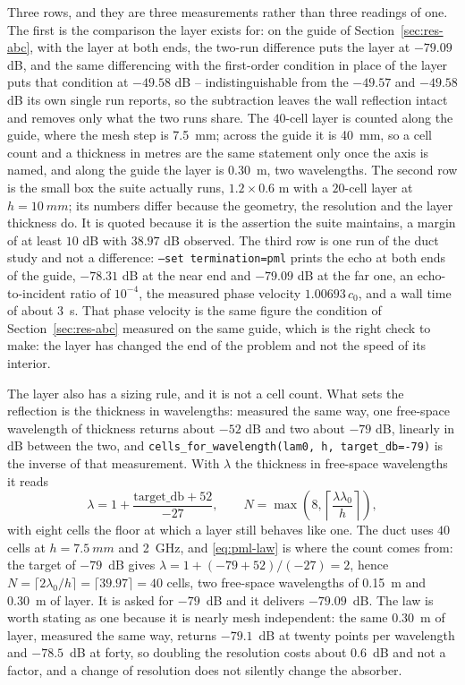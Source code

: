 Three rows, and they are three measurements rather than three readings of one. The first is the comparison the
layer exists for: on the guide of Section~\ref{sec:res-abc}, with the layer at both ends, the two-run
difference puts the layer at $-79.09$ dB, and the same differencing with the first-order condition in place of
the layer puts that condition at $-49.58$ dB -- indistinguishable from the $-49.57$ and $-49.58$ dB its own
single run reports, so the subtraction leaves the wall reflection intact and removes only what the two runs
share. The $40$-cell layer is counted along the guide, where the mesh step is \SI{7.5}{mm}; across the guide
it is \SI{40}{mm}, so a cell count and a thickness in metres are the same statement only once the axis is
named, and along the guide the layer is \SI{0.30}{m}, two wavelengths. The second row is the small box the
suite actually runs, $1.2\times0.6$ m with a $20$-cell layer at
$h=\SI{10}{mm}$; its numbers differ because the geometry, the resolution and the layer thickness do. It is
quoted because it is the assertion the suite maintains, a margin of at least $10$ dB with $38.97$ dB observed.
The third row is one run of the duct study and not a difference: \texttt{--set termination=pml} prints the
echo at both ends of the guide, $-78.31$ dB at the near end and $-79.09$ dB at the far one, an echo-to-incident
ratio of $10^{-4}$, the measured phase velocity $1.00693\,c_0$, and a wall time of about \SI{3}{\second}. That
phase velocity is the same figure the condition of Section~\ref{sec:res-abc} measured on the same guide, which
is the right check to make: the layer has changed the end of the problem and not the speed of its interior.

The layer also has a sizing rule, and it is not a cell count. What sets the reflection is the thickness in
wavelengths: measured the same way, one free-space wavelength of thickness returns about $-52$ dB and two about
$-79$ dB, linearly in dB between the two, and \texttt{cells\_for\_wavelength(lam0, h, target\_db=-79)} is the
inverse of that measurement. With $\lambda$ the thickness in free-space wavelengths it reads
\begin{equation}
  \lambda = 1 + \frac{\mathrm{target\_db}+52}{-27}, \qquad
  N = \max\!\left(8, \left\lceil \frac{\lambda\lambda_0}{h} \right\rceil\right),
  \label{eq:pml-law}
\end{equation}
with eight cells the floor at which a layer still behaves like one. The duct uses $40$ cells at
$h=\SI{7.5}{mm}$ and \SI{2}{\giga\hertz}, and \eqref{eq:pml-law} is where the count comes from: the target
of $-79$~dB gives $\lambda=1+(-79+52)/(-27)=2$, hence $N=\lceil 2\lambda_0/h\rceil=\lceil 39.97\rceil=40$
cells, two free-space wavelengths of \SI{0.15}{m} and \SI{0.30}{m} of layer. It is asked for $-79$~dB and it
delivers $-79.09$~dB. The law is worth stating as one because it is nearly mesh independent: the same
\SI{0.30}{m} of layer, measured the same way, returns $-79.1$~dB at twenty points per wavelength and
$-78.5$~dB at forty, so doubling the resolution costs about $0.6$~dB and not a factor, and a change of
resolution does not silently change the absorber.

